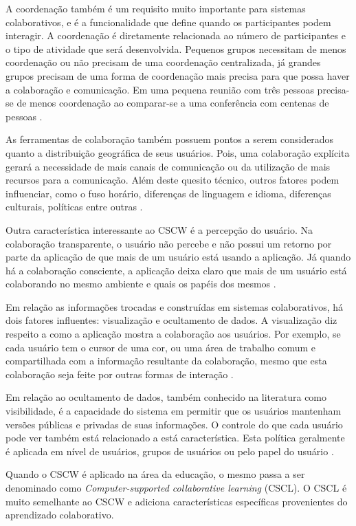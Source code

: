 A coordenação também é um requisito muito importante para sistemas colaborativos, e é a funcionalidade que define quando os participantes podem interagir. A coordenação é diretamente relacionada ao número de participantes e o tipo de atividade que será desenvolvida. Pequenos grupos necessitam de menos coordenação ou não precisam de uma coordenação centralizada, já grandes grupos precisam de uma forma de coordenação mais precisa para que possa haver a colaboração e comunicação. Em uma pequena reunião com três pessoas precisa-se de menos coordenação ao comparar-se a uma conferência com centenas de pessoas \cite{reinhard_cscw_1994}.

As ferramentas de colaboração também possuem pontos a serem considerados quanto a distribuição geográfica de seus usuários. Pois, uma colaboração explícita gerará a necessidade de mais canais de comunicação ou da utilização de mais recursos para a comunicação. Além deste quesito técnico, outros fatores podem influenciar, como o fuso horário, diferenças de linguagem e idioma, diferenças culturais, políticas entre outras \cite{reinhard_cscw_1994}.

Outra característica interessante ao CSCW é a percepção do usuário. Na colaboração transparente, o usuário não percebe e não possui um retorno por parte da aplicação de que mais de um usuário está usando a aplicação. Já quando há a colaboração consciente, a aplicação deixa claro que mais de um usuário está colaborando no mesmo ambiente e quais os papéis dos mesmos \cite{reinhard_cscw_1994}.

Em relação as informações trocadas e construídas em sistemas colaborativos, há dois fatores influentes: visualização e ocultamento de dados. A visualização diz respeito a como a aplicação mostra a colaboração aos usuários. Por exemplo, se cada usuário tem o cursor de uma cor, ou uma área de trabalho comum e compartilhada com a informação resultante da colaboração, mesmo que esta colaboração seja feite por outras formas de interação \cite{reinhard_cscw_1994}.

Em relação ao ocultamento de dados, também conhecido na literatura como visibilidade, é a capacidade do sistema em permitir que os usuários mantenham versões públicas e privadas de suas informações. O controle do que cada usuário pode ver também está relacionado a está característica. Esta política geralmente é aplicada em nível de usuários, grupos de usuários ou pelo papel do usuário \cite{ramanau_researching_2009, reinhard_cscw_1994}.

Quando o CSCW é aplicado na área da educação, o mesmo passa a ser denominado como \emph{Computer-supported collaborative learning} (CSCL). O CSCL é muito semelhante ao CSCW e adiciona características específicas provenientes do aprendizado colaborativo.


